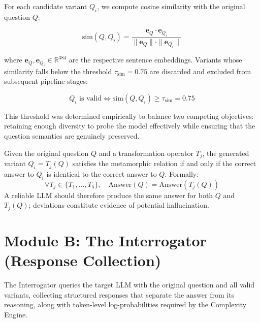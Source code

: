 For each candidate variant $Q_i$, we compute cosine similarity with the original question $Q$:

\begin{equation}
    \text{sim}(Q, Q_i) = \frac{\mathbf{e}_Q \cdot \mathbf{e}_{Q_i}}{\|\mathbf{e}_Q\| \cdot \|\mathbf{e}_{Q_i}\|}
    \label{eq:cosine_sim}
\end{equation}

\noindent
where $\mathbf{e}_Q, \mathbf{e}_{Q_i} \in \mathbb{R}^{384}$ are the respective sentence embeddings. Variants whose similarity falls below the threshold $\tau_{\text{sim}} = 0.75$ are discarded and excluded from subsequent pipeline stages:

\begin{equation}
    Q_i \text{ is valid} \iff \text{sim}(Q, Q_i) \geq \tau_{\text{sim}} = 0.75
\end{equation}

\noindent
This threshold was determined empirically to balance two competing objectives: retaining enough diversity to probe the model effectively while ensuring that the question semantics are genuinely preserved.

\begin{definition}
Given the original question $Q$ and a transformation operator $T_j$, the generated variant $Q_i = T_j(Q)$ satisfies the metamorphic relation if and only if the correct answer to $Q_i$ is identical to the correct answer to $Q$. Formally:
\begin{equation}
    \forall T_j \in \{T_1, \ldots, T_5\}, \quad \text{Answer}(Q) = \text{Answer}(T_j(Q))
\end{equation}
A reliable LLM should therefore produce the same answer for both $Q$ and $T_j(Q)$; deviations constitute evidence of potential hallucination.
\end{definition}


\section{Module B: The Interrogator (Response Collection)}

The Interrogator queries the target LLM with the original question and all valid variants, collecting structured responses that separate the answer from its reasoning, along with token-level log-probabilities required by the Complexity Engine.

